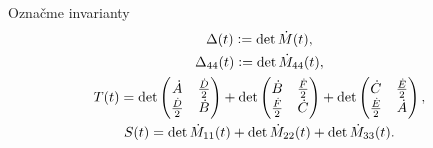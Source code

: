 Označme invarianty
\begin{gather*} 
\Delta(t) \vcentcolon =  \det \dot{M}(t), \\
\Delta_{44}(t) \vcentcolon = \det \dot{M}_{44}(t), \\
T(t) = \det \left( \begin{matrix}
\dot{A} & \frac{\dot{D}}{2} \\ 
\frac{\dot{D}}{2} & \dot{B}
\end{matrix} \right) + \det \left( \begin{matrix}
\dot{B} & \frac{\dot{F}}{2} \\ 
\frac{\dot{F}}{2} & \dot{C}
\end{matrix} \right) + \det \left(  \begin{matrix}
\dot{C} & \frac{\dot{E}}{2} \\ 
\frac{\dot{E}}{2} & \dot{A}
\end{matrix} \right), \\
S(t) = \det \dot{M}_{11}(t) + \det \dot{M}_{22}(t) + \det \dot{M}_{33}(t).
\end{gather*} 
